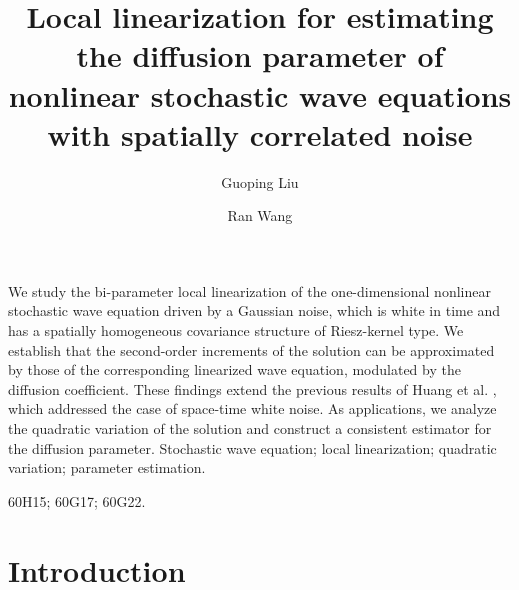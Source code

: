 \documentclass[11pt,reqno]{amsart}
\title[Local linearization  for  the SWE]{Local linearization for  estimating the diffusion parameter of  nonlinear stochastic   wave equations with spatially correlated noise}
\date{}
\numberwithin{equation}{section}
\newcommand{\1}{{\bf 1}}
\newcommand{\2}{{\bf 2}}
\begin{document}
            \author[G.P. Liu]{Guoping Liu}  
\address[]{Guoping Liu, School of Mathematics and Statistics, 
Huazhong University of Science and Technology,  Wuhan, 430074, 
China.}

    \author[R. Wang]{Ran Wang}
    \address[]{Ran Wang, School of Mathematics and Statistics,  Wuhan University,  Wuhan, 430072,
    China.}
 
 
    \maketitle
       We study the bi-parameter local linearization  of the one-dimensional nonlinear stochastic wave equation  driven by a Gaussian noise,   which  is white in time and has a spatially homogeneous covariance structure of Riesz-kernel type.   We establish that the second-order increments of the solution can be approximated by those of the corresponding linearized wave equation, modulated by the diffusion coefficient. These findings extend the previous results of Huang et al. \cite{HOO2024}, which addressed the case of space-time white noise. As applications, we analyze the quadratic variation of the solution and construct a consistent estimator for the diffusion parameter.
              \vskip0.3cm
  {Stochastic wave equation; local linearization;   quadratic variation; parameter estimation.}
 \vskip0.3cm


 {60H15; 60G17; 60G22.}
    \section{Introduction  }
\end{document}
